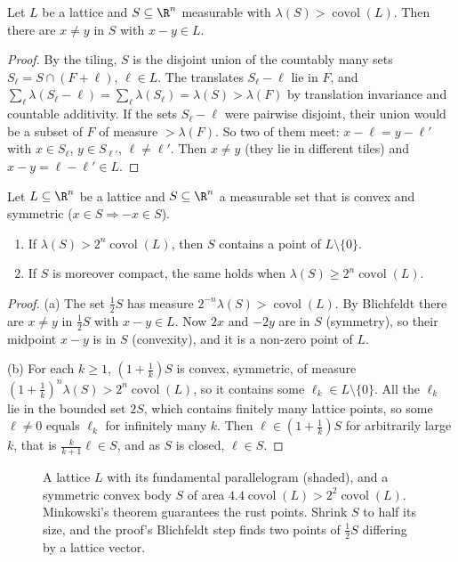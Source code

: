 \begin{lemma}[Blichfeldt]\label{lem:blichfeldt}
Let $L$ be a lattice and $S\subseteq\R^n$ measurable with $\lambda(S)>\operatorname{covol}(L)$. Then there are $x\ne y$ in
$S$ with $x-y\in L$.
\end{lemma}
\begin{proof}
By the tiling, $S$ is the disjoint union of the countably many sets $S_\ell=S\cap(F+\ell)$, $\ell\in L$. The translates
$S_\ell-\ell$ lie in $F$, and $\sum_\ell\lambda(S_\ell-\ell)=\sum_\ell\lambda(S_\ell)=\lambda(S)>\lambda(F)$ by translation
invariance and countable additivity. If the sets $S_\ell-\ell$ were pairwise disjoint, their union would be a subset of
$F$ of measure $>\lambda(F)$. So two of them meet: $x-\ell=y-\ell'$ with $x\in S_\ell$, $y\in S_{\ell'}$, $\ell\ne\ell'$.
Then $x\ne y$ (they lie in different tiles) and $x-y=\ell-\ell'\in L$.
\end{proof}

\begin{theorem}\label{thm:minkowski}
Let $L\subseteq\R^n$ be a lattice and $S\subseteq\R^n$ a measurable set that is convex and symmetric ($x\in S\Rightarrow
-x\in S$).
\begin{enumerate}[label=(\alph*)]
\item If $\lambda(S)>2^n\operatorname{covol}(L)$, then $S$ contains a point of $L\setminus\{0\}$.
\item If $S$ is moreover compact, the same holds when $\lambda(S)\ge2^n\operatorname{covol}(L)$.
\end{enumerate}
\end{theorem}
\begin{proof}
(a) The set $\frac12S$ has measure $2^{-n}\lambda(S)>\operatorname{covol}(L)$. By Blichfeldt there are $x\ne y$ in
$\frac12S$ with $x-y\in L$. Now $2x$ and $-2y$ are in $S$ (symmetry), so their midpoint $x-y$ is in $S$ (convexity), and
it is a non-zero point of $L$.

(b) For each $k\ge1$, $(1+\frac1k)S$ is convex, symmetric, of measure $(1+\frac1k)^n\lambda(S)>2^n\operatorname{covol}(L)$,
so it contains some $\ell_k\in L\setminus\{0\}$. All the $\ell_k$ lie in the bounded set $2S$, which contains finitely
many lattice points, so some $\ell\ne0$ equals $\ell_k$ for infinitely many $k$. Then $\ell\in(1+\frac1k)S$ for
arbitrarily large $k$, that is $\frac{k}{k+1}\ell\in S$, and as $S$ is closed, $\ell\in S$.
\end{proof}

\begin{figure}[ht]
\centering
{}
\caption{A lattice $L$ with its fundamental parallelogram (shaded), and a symmetric convex body $S$ of area
$4.4\operatorname{covol}(L)>2^2\operatorname{covol}(L)$. Minkowski's theorem guarantees the rust points. Shrink $S$ to
half its size, and the proof's Blichfeldt step finds two points of $\frac12S$ differing by a lattice vector.}
\label{fig:mink3}
\end{figure}

